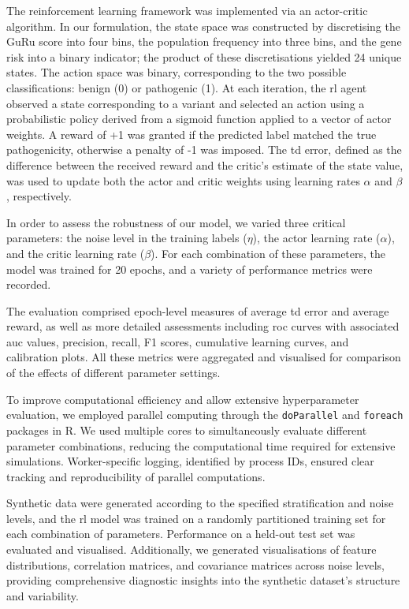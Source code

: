 The reinforcement learning framework was implemented via an actor-critic algorithm. In our formulation, the state space was constructed by discretising the GuRu score into four bins, the population frequency into three bins, and the gene risk into a binary indicator; the product of these discretisations yielded 24 unique states. The action space was binary, corresponding to the two possible classifications: benign (0) or pathogenic (1). At each iteration, the \ac{rl} agent observed a state corresponding to a variant and selected an action using a probabilistic policy derived from a sigmoid function applied to a vector of actor weights. A reward of +1 was granted if the predicted label matched the true pathogenicity, otherwise a penalty of -1 was imposed. The \ac{td} error, defined as the difference between the received reward and the critic’s estimate of the state value, was used to update both the actor and critic weights using learning rates $\alpha$ and $\beta$, respectively.

In order to assess the robustness of our model, we varied three critical parameters: the noise level in the training labels ($\eta$), the actor learning rate ($\alpha$), and the critic learning rate ($\beta$). For each combination of these parameters, the model was trained for 20 epochs, and a variety of performance metrics were recorded.

The evaluation comprised epoch-level measures of average \ac{td} error and average reward, as well as more detailed assessments including \ac{roc} curves with associated \ac{auc} values, precision, recall, F1 scores, cumulative learning curves, and calibration plots. All these metrics were aggregated and visualised for comparison of the effects of different parameter settings.

To improve computational efficiency and allow extensive hyperparameter evaluation, we employed parallel computing through the \texttt{doParallel} and \texttt{foreach} packages in R. We used multiple cores to simultaneously evaluate different parameter combinations, reducing the computational time required for extensive simulations. Worker-specific logging, identified by process IDs, ensured clear tracking and reproducibility of parallel computations.

Synthetic data were generated according to the specified stratification and noise levels, and the \ac{rl} model was trained on a randomly partitioned training set for each combination of parameters. Performance on a held-out test set was evaluated and visualised.
Additionally, we generated visualisations of feature distributions, correlation matrices, and covariance matrices across noise levels, providing comprehensive diagnostic insights into the synthetic dataset’s structure and variability.

